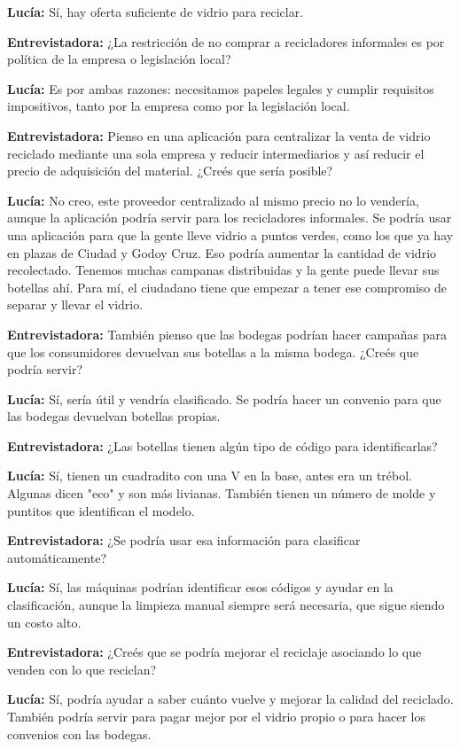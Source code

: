 \textbf{Lucía:} Sí, hay oferta suficiente de vidrio para reciclar.

\textbf{Entrevistadora:} ¿La restricción de no comprar a recicladores informales es por política de la empresa o legislación local?

\textbf{Lucía:} Es por ambas razones: necesitamos papeles legales y cumplir requisitos impositivos, tanto por la empresa como por la legislación local.

\textbf{Entrevistadora:} Pienso en una aplicación para centralizar la venta de vidrio reciclado mediante una sola empresa y reducir intermediarios y así reducir el precio de adquisición del material. ¿Creés que sería posible?

\textbf{Lucía:} No creo, este proveedor centralizado al mismo precio no lo vendería, aunque la aplicación podría servir para los recicladores informales. Se podría usar una aplicación para que la gente lleve vidrio a puntos verdes, como los que ya hay en plazas de Ciudad y Godoy Cruz. Eso podría aumentar la cantidad de vidrio recolectado. Tenemos muchas campanas distribuidas y la gente puede llevar sus botellas ahí. Para mí, el ciudadano tiene que empezar a tener ese compromiso de separar y llevar el vidrio.

\textbf{Entrevistadora:} También pienso que las bodegas podrían hacer campañas para que los consumidores devuelvan sus botellas a la misma bodega. ¿Creés que podría servir?

\textbf{Lucía:} Sí, sería útil y vendría clasificado. Se podría hacer un convenio para que las bodegas devuelvan botellas propias.

\textbf{Entrevistadora:} ¿Las botellas tienen algún tipo de código para identificarlas?

\textbf{Lucía:} Sí, tienen un cuadradito con una V en la base, antes era un trébol. Algunas dicen "eco" y son más livianas. También tienen un número de molde y puntitos que identifican el modelo.

\textbf{Entrevistadora:} ¿Se podría usar esa información para clasificar automáticamente?

\textbf{Lucía:} Sí, las máquinas podrían identificar esos códigos y ayudar en la clasificación, aunque la limpieza manual siempre será necesaria, que sigue siendo un costo alto.

\textbf{Entrevistadora:} ¿Creés que se podría mejorar el reciclaje asociando lo que venden con lo que reciclan?

\textbf{Lucía:} Sí, podría ayudar a saber cuánto vuelve y mejorar la calidad del reciclado. También podría servir para pagar mejor por el vidrio propio o para hacer los convenios con las bodegas.

